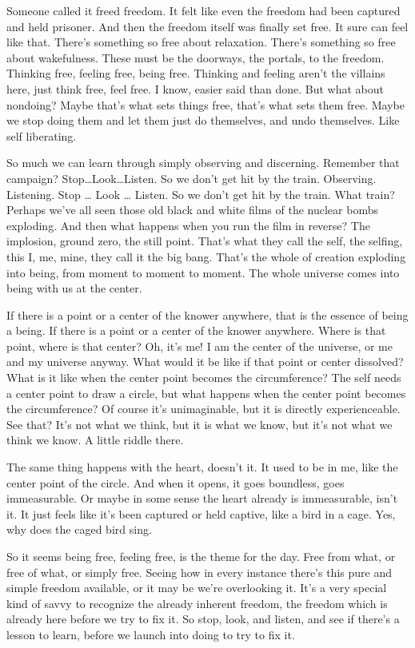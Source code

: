 \documentclass[12pt,openany]{book}
\begin{document}
Someone called it freed freedom. It felt like even the freedom had been captured and held prisoner. And then the freedom itself was finally set free. It sure can feel like that. There's something so free about relaxation. There’s something so free about wakefulness. These must be the doorways, the portals, to the freedom. Thinking free, feeling free, being free. Thinking and feeling aren't the villains here, just think free, feel free. I know, easier said than done. But what about nondoing? Maybe that's what sets things free, that’s what sets them free. Maybe we stop doing them and let them just do themselves, and undo themselves. Like self liberating.

So much we can learn through simply observing and discerning. Remember that campaign? Stop…Look…Listen. So we don't get hit by the train. Observing. Listening. Stop … Look … Listen. So we don't get hit by the train. What train? Perhaps we've all seen those old black and white films of the nuclear bombs exploding. And then what happens when you run the film in reverse? The implosion, ground zero, the still point. That's what they call the self, the selfing, this I, me, mine, they call it the big bang. That's the whole of creation exploding into being, from moment to moment to moment. The whole universe comes into being with us at the center.

If there is a point or a center of the knower anywhere, that is the essence of being a being. If there is a point or a center of the knower anywhere. Where is that point, where is that center? Oh, it's me! I am the center of the universe, or me and my universe anyway. What would it be like if that point or center dissolved? What is it like when the center point becomes the circumference? The self needs a center point to draw a circle, but what happens when the center point becomes the circumference? Of course it's unimaginable, but it is directly experienceable. See that? It's not what we think, but it is what we know, but it’s not what we think we know. A little riddle there.

The same thing happens with the heart, doesn't it. It used to be in me, like the center point of the circle. And when it opens, it goes boundless, goes immeasurable. Or maybe in some sense the heart already is immeasurable, isn't it. It just feels like it's been captured or held captive, like a bird in a cage. Yes, why does the caged bird sing.

So it seems being free, feeling free, is the theme for the day. Free from what, or free of what, or simply free. Seeing how in every instance there's this pure and simple freedom available, or it may be we're overlooking it. It's a very special kind of savvy to recognize the already inherent freedom, the freedom which is already here before we try to fix it. So stop, look, and listen, and see if there's a lesson to learn, before we launch into doing to try to fix it.
\end{document}

